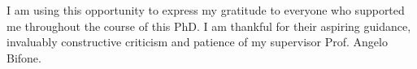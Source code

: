I am using this opportunity to express my gratitude to everyone who supported me throughout the course of this PhD.
I am thankful for their aspiring guidance, invaluably constructive criticism and patience of my supervisor Prof. Angelo Bifone.

